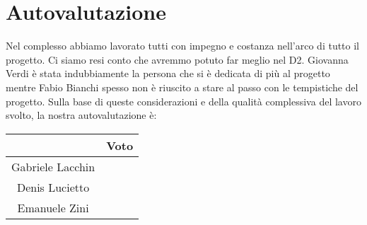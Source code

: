 \documentclass{article}
\begin{document}
\section{Autovalutazione}
Nel complesso abbiamo lavorato tutti con impegno e costanza nell'arco di tutto il progetto. Ci
siamo resi conto che avremmo potuto far meglio nel D2. Giovanna Verdi è stata indubbiamente
la persona che si è dedicata di più al progetto mentre Fabio Bianchi spesso non è riuscito a
stare al passo con le tempistiche del progetto. Sulla base di queste considerazioni e della
qualità complessiva del lavoro svolto, la nostra autovalutazione è:

\begin{center}
    \begin{tabular}{|c|c|}
        \hline
                         & Voto \\
        \hline
        Gabriele Lacchin &      \\
        \hline
        Denis Lucietto   &      \\
        \hline
        Emanuele Zini    &      \\
        \hline
    \end{tabular}
\end{center}
\end{document}
